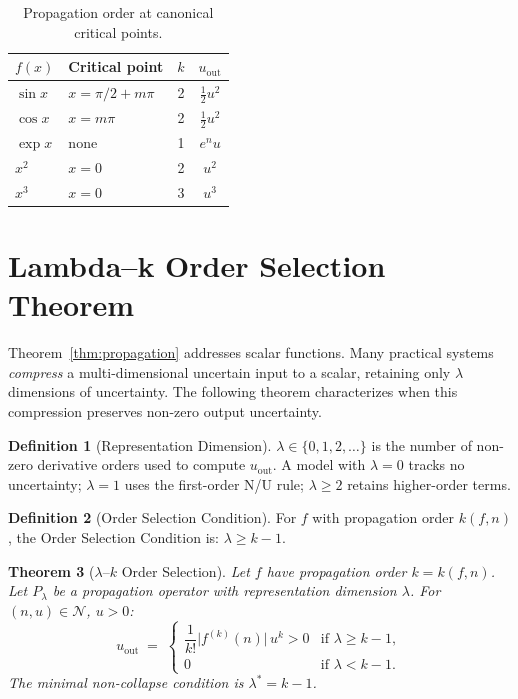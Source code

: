 \documentclass[11pt]{article}
\newtheorem{theorem}{Theorem}[section]
\theoremstyle{definition}
\newtheorem{definition}[theorem]{Definition}
\begin{document}
\begin{table}[h]
\centering
\caption{Propagation order at canonical critical points.}
\label{tab:canonical}
\begin{tabular}{llcc}
\toprule
$f(x)$ & Critical point & $k$ & $u_{\mathrm{out}}$ \\
\midrule
$\sin x$ & $x = \pi/2 + m\pi$ & 2 & $\tfrac{1}{2}u^2$ \\
$\cos x$ & $x = m\pi$ & 2 & $\tfrac{1}{2}u^2$ \\
$\exp x$ & none & 1 & $e^n u$ \\
$x^2$    & $x = 0$ & 2 & $u^2$ \\
$x^3$    & $x = 0$ & 3 & $u^3$ \\
\bottomrule
\end{tabular}
\end{table}

\section{Lambda--k Order Selection Theorem}
\label{sec:orderselection}

Theorem~\ref{thm:propagation} addresses scalar functions.
Many practical systems \emph{compress} a multi-dimensional uncertain input to a
scalar, retaining only $\lambda$ dimensions of uncertainty.
The following theorem characterizes when this compression preserves non-zero output
uncertainty.

\begin{definition}[Representation Dimension]
$\lambda \in \{0, 1, 2, \ldots\}$ is the number of non-zero derivative orders used
to compute $u_{\mathrm{out}}$.
A model with $\lambda=0$ tracks no uncertainty; $\lambda=1$ uses the first-order
N/U rule; $\lambda \ge 2$ retains higher-order terms.
\end{definition}

\begin{definition}[Order Selection Condition]
For $f$ with propagation order $k(f,n)$, the Order Selection Condition is:
$\lambda \ge k-1$.
\end{definition}

\begin{theorem}[$\lambda$--$k$ Order Selection]
\label{thm:orderselection}
Let $f$ have propagation order $k = k(f,n)$.
Let $P_\lambda$ be a propagation operator with representation dimension $\lambda$.
For $(n, u) \in \mathcal{N}$, $u > 0$:
\[
  u_{\mathrm{out}} \;=\;
  \begin{cases}
    \dfrac{1}{k!}\bigl|f^{(k)}(n)\bigr|\,u^k > 0 & \text{if } \lambda \ge k-1, \\[6pt]
    0 & \text{if } \lambda < k-1.
  \end{cases}
\]
The minimal non-collapse condition is $\lambda^* = k-1$.
\end{theorem}
\end{document}
